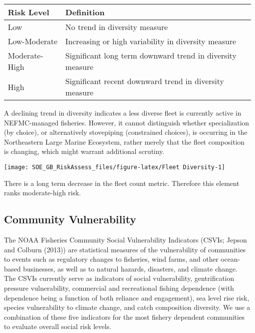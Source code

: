 \documentclass[11pt,]{article}
\let\origfigure\figure
\let\endorigfigure\endfigure
\renewenvironment{figure}[1][2] {
    \expandafter\origfigure\expandafter[H]
} {
    \endorigfigure
}
\begin{document}
\begin{longtable}[]{@{}ll@{}}
\toprule
Risk Level & Definition\tabularnewline
\midrule
\endhead
Low & No trend in diversity measure\tabularnewline
Low-Moderate & Increasing or high variability in diversity
measure\tabularnewline
Moderate-High & Significant long term downward trend in diversity
measure\tabularnewline
High & Significant recent downward trend in diversity
measure\tabularnewline
\bottomrule
\end{longtable}

A declining trend in diversity indicates a less diverse fleet is
currently active in NEFMC-managed fisheries. However, it cannot
distinguish whether specialization (by choice), or alternatively
stovepiping (constrained choices), is occurring in the Northeastern
Large Marine Ecosystem, rather merely that the fleet composition is
changing, which might warrant additional scrutiny.

\begin{figure}

{\centering \texttt{[image: SOE\_GB\_RiskAssess\_files/figure-latex/Fleet Diversity-1]} 

}

\caption{A: fleet count, B: average fleet diversity  \label{fleetdiv}}\label{fig:Fleet Diversity}
\end{figure}

There is a long term decrease in the fleet count metric. Therefore this
element ranks moderate-high risk.

\subsection{Community Vulnerability}\label{community-vulnerability}

The NOAA Fisheries Community Social Vulnerability Indicators (CSVIs;
Jepson and Colburn (2013)) are statistical measures of the vulnerability
of communities to events such as regulatory changes to fisheries, wind
farms, and other ocean-based businesses, as well as to natural hazards,
disasters, and climate change. The CSVIs currently serve as indicators
of social vulnerability, gentrification pressure vulnerability,
commercial and recreational fishing dependence (with dependence being a
function of both reliance and engagement), sea level rise risk, species
vulnerability to climate change, and catch composition diversity. We use
a combination of these five indicators for the most fishery dependent
communities to evaluate overall social risk levels.
\end{document}
